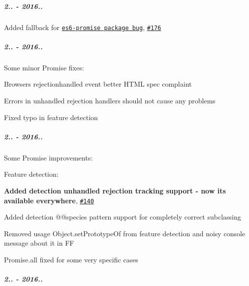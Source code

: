 \subparagraph*{2.. -\/ 2016..}


\begin{DoxyItemize}
\item Added fallback for \href{https://github.com/stefanpenner/es6-promise/issues/169}{\tt {\ttfamily es6-\/promise} package bug}, \href{https://github.com/zloirock/core-js/issues/176}{\tt \#176}
\end{DoxyItemize}

\subparagraph*{2.. -\/ 2016..}


\begin{DoxyItemize}
\item Some minor {\ttfamily Promise} fixes\+:
\begin{DoxyItemize}
\item Browsers {\ttfamily rejectionhandled} event better H\+T\+ML spec complaint
\item Errors in unhandled rejection handlers should not cause any problems
\item Fixed typo in feature detection
\end{DoxyItemize}
\end{DoxyItemize}

\subparagraph*{2.. -\/ 2016..}


\begin{DoxyItemize}
\item Some {\ttfamily Promise} improvements\+:
\begin{DoxyItemize}
\item Feature detection\+:
\begin{DoxyItemize}
\item {\bfseries Added detection unhandled rejection tracking support -\/ now it\textquotesingle{}s available everywhere}, \href{https://github.com/zloirock/core-js/issues/140}{\tt \#140}
\item Added detection {\ttfamily @@species} pattern support for completely correct subclassing
\item Removed usage {\ttfamily Object.\+set\+Prototype\+Of} from feature detection and noisy console message about it in FF
\end{DoxyItemize}
\item {\ttfamily Promise.\+all} fixed for some very specific cases
\end{DoxyItemize}
\end{DoxyItemize}

\subparagraph*{2.. -\/ 2016..}



